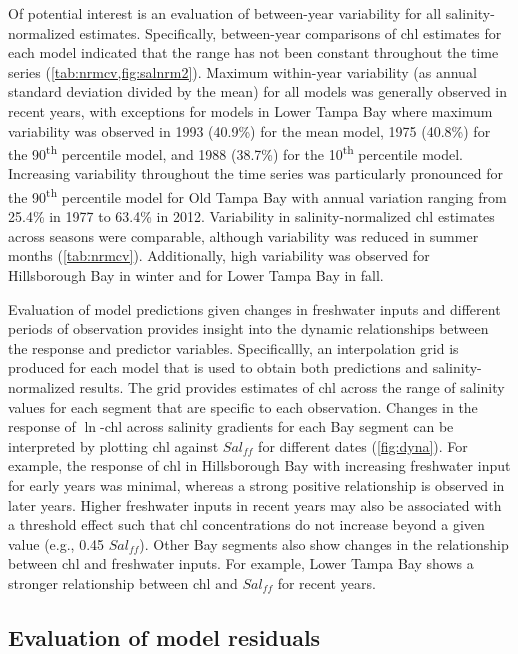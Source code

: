 \documentclass[letterpaper,12pt,oneside]{article}\usepackage[]{graphicx}\usepackage[]{color}
\newcommand{\nine}{90\textsuperscript{th} percentile }
\newcommand{\ten}{10\textsuperscript{th} percentile }
\begin{document}
Of potential interest is an evaluation of between-year variability for all salinity-normalized estimates.  Specifically, between-year comparisons of \ac{chl} estimates for each model indicated that the range has not been constant throughout the time series (\cref{tab:nrmcv,fig:salnrm2}).  Maximum within-year variability (as annual standard deviation divided by the mean) for all models was generally observed in recent years, with exceptions for models in Lower Tampa Bay where maximum variability was observed in 1993 (40.9\%) for the mean model, 1975 (40.8\%) for the \nine model, and 1988 (38.7\%) for the \ten model.  Increasing variability throughout the time series was particularly pronounced for the \nine model for Old Tampa Bay with annual variation ranging from 25.4\% in 1977  to 63.4\% in 2012.  Variability in salinity-normalized \ac{chl} estimates across seasons were comparable, although variability was reduced in summer months (\cref{tab:nrmcv}).  Additionally, high variability was observed for Hillsborough Bay in winter and for Lower Tampa Bay in fall.

Evaluation of model predictions given changes in freshwater inputs and different periods of observation provides insight into the dynamic relationships between the response and predictor variables. Specificallly, an interpolation grid is produced for each model that is used to obtain both predictions and salinity-normalized results.  The grid provides estimates of \ac{chl} across the range of salinity values for each segment that are specific to each observation.  Changes in the response of $\ln$-\ac{chl} across salinity gradients for each Bay segment can be interpreted by plotting \ac{chl} against $Sal_{ff}$ for different dates (\cref{fig:dyna}).  For example, the response of \ac{chl} in Hillsborough Bay with increasing freshwater input for early years was minimal, whereas a strong positive relationship is observed in later years.  Higher freshwater inputs in recent years may also be associated with a threshold effect such that \ac{chl} concentrations do not increase beyond a given value (e.g., 0.45 $Sal_{ff}$).  Other Bay segments also show changes in the relationship between \ac{chl} and freshwater inputs.  For example, Lower Tampa Bay shows a stronger relationship between \ac{chl} and $Sal_{ff}$ for recent years. 

\subsection{Evaluation of model residuals}
\end{document}
